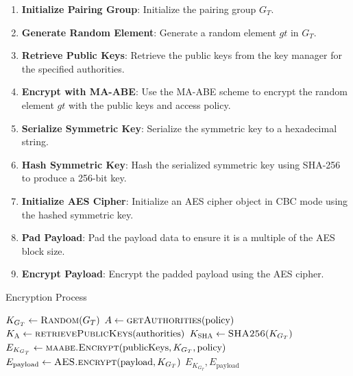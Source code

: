 \documentclass[cic,tc,english]{iiufrgs}
\begin{document}
                \begin{enumerate}
                    \item \textbf{Initialize Pairing Group}: Initialize the pairing group \(G_T\).
                    \item \textbf{Generate Random Element}: Generate a random element \(gt\) in \(G_T\).
                    \item \textbf{Retrieve Public Keys}: Retrieve the public keys from the key manager for the specified authorities.
                    \item \textbf{Encrypt with MA-ABE}: Use the MA-ABE scheme to encrypt the random element \(gt\) with the public keys and access policy.
                    \item \textbf{Serialize Symmetric Key}: Serialize the symmetric key to a hexadecimal string.
                    \item \textbf{Hash Symmetric Key}: Hash the serialized symmetric key using SHA-256 to produce a 256-bit key.
                    \item \textbf{Initialize AES Cipher}: Initialize an AES cipher object in CBC mode using the hashed symmetric key.
                    \item \textbf{Pad Payload}: Pad the payload data to ensure it is a multiple of the AES block size.
                    \item \textbf{Encrypt Payload}: Encrypt the padded payload using the AES cipher.
                \end{enumerate}

                \begin{algorithm}
                    \caption{Encryption Process}
                    \label{alg:encryption_process}
                    \scriptsize
                    \begin{algorithmic}[1]
                        \State $K_{G_T} \gets \textsc{Random}(G_T)$
                        \State $A \gets \textsc{getAuthorities}(\text{policy})$
                        \State $K_{\textsc{A}} \gets \textsc{retrievePublicKeys}(\text{authorities})$
                        \State $K_{\textsc{SHA}} \gets \textsc{SHA256}(K_{G_T})$
                        \State $E_{K_{G_T}} \gets \textsc{maabe.Encrypt}(\text{publicKeys}, K_{G_T}, \text{policy})$
                        \State $E_{\text{payload}} \gets \textsc{AES.encrypt}(\text{payload}, K_{G_T})$
                        \State \Return $E_{K_{G_T}}, E_{\text{payload}}$
                    \EndProcedure
                    \end{algorithmic}
                \end{algorithm}
\end{document}
